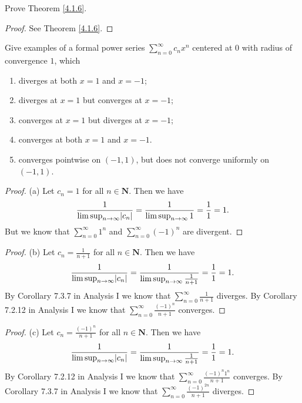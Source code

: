 \begin{exercise}\label{ex 4.1.1}
    Prove Theorem \ref{4.1.6}.
\end{exercise}

\begin{proof}
    See Theorem \ref{4.1.6}.
\end{proof}

\begin{exercise}\label{ex 4.1.2}
    Give examples of a formal power series \(\sum_{n = 0}^\infty c_n x^n\) centered at \(0\) with radius of convergence \(1\), which
    \begin{enumerate}
        \item diverges at both \(x = 1\) and \(x = -1\);
        \item diverges at \(x = 1\) but converges at \(x = -1\);
        \item converges at \(x = 1\) but diverges at \(x = -1\);
        \item converges at both \(x = 1\) and \(x = -1\).
        \item converges pointwise on \((-1, 1)\), but does not converge uniformly on \((-1, 1)\).
    \end{enumerate}
\end{exercise}

\begin{proof}{(a)}
    Let \(c_n = 1\) for all \(n \in \mathbf{N}\).
    Then we have
    \[
        \frac{1}{\limsup_{n \to \infty} \abs*{c_n}} = \frac{1}{\limsup_{n \to \infty} 1} = \frac{1}{1} = 1.
    \]
    But we know that \(\sum_{n = 0}^\infty 1^n\) and \(\sum_{n = 0}^\infty (-1)^n\) are divergent.
\end{proof}

\begin{proof}{(b)}
    Let \(c_n = \frac{1}{n + 1}\) for all \(n \in \mathbf{N}\).
    Then we have
    \[
        \frac{1}{\limsup_{n \to \infty} \abs*{c_n}} = \frac{1}{\limsup_{n \to \infty} \frac{1}{n + 1}} = \frac{1}{1} = 1.
    \]
    By Corollary 7.3.7 in Analysis I we know that \(\sum_{n = 0}^\infty \frac{1}{n + 1}\) diverges.
    By Corollary 7.2.12 in Analysis I we know that \(\sum_{n = 0}^\infty \frac{(-1)^n}{n + 1}\) converges.
\end{proof}

\begin{proof}{(c)}
    Let \(c_n = \frac{(-1)^n}{n + 1}\) for all \(n \in \mathbf{N}\).
    Then we have
    \[
        \frac{1}{\limsup_{n \to \infty} \abs*{c_n}} = \frac{1}{\limsup_{n \to \infty} \frac{1}{n + 1}} = \frac{1}{1} = 1.
    \]
    By Corollary 7.2.12 in Analysis I we know that \(\sum_{n = 0}^\infty \frac{(-1)^n 1^n}{n + 1}\) converges.
    By Corollary 7.3.7 in Analysis I we know that \(\sum_{n = 0}^\infty \frac{(-1)^{2n}}{n + 1}\) diverges.
\end{proof}

